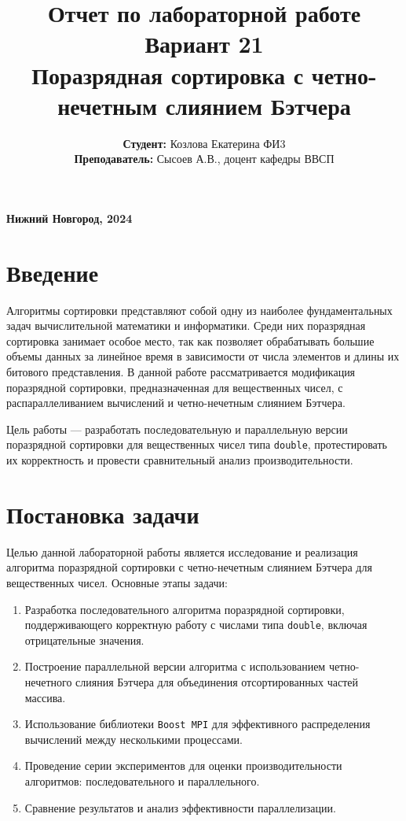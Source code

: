 \documentclass[a4paper,12pt]{article}
\title{
\vspace{6cm}
\textbf{\Large Отчет по лабораторной работе}\\[0.5cm]
\textbf{\Large Вариант 21}\\
\textbf{\Large Поразрядная сортировка с четно-нечетным слиянием Бэтчера} \\[1.0cm]
}
\author{
\textbf{Студент:} Козлова Екатерина ФИ3\\[0.2cm]
\textbf{Преподаватель:} Сысоев А.В., доцент кафедры ВВСП \\[5cm]
}
\date{}
\begin{document}
\maketitle
\vfill
\begin{center}
\textbf{\normalsize Нижний Новгород, 2024}
\end{center}

\newpage

\section*{\centering Введение}

Алгоритмы сортировки представляют собой одну из наиболее фундаментальных задач вычислительной математики и информатики. Среди них поразрядная сортировка занимает особое место, так как позволяет обрабатывать большие объемы данных за линейное время в зависимости от числа элементов и длины их битового представления. В данной работе рассматривается модификация поразрядной сортировки, предназначенная для вещественных чисел, с распараллеливанием вычислений и четно-нечетным слиянием Бэтчера. 

Цель работы — разработать последовательную и параллельную версии поразрядной сортировки для вещественных чисел типа \texttt{double}, протестировать их корректность и провести сравнительный анализ производительности.

\newpage

\section*{\centering Постановка задачи}

Целью данной лабораторной работы является исследование и реализация алгоритма поразрядной сортировки с четно-нечетным слиянием Бэтчера для вещественных чисел. Основные этапы задачи:
\begin{enumerate}
    \item Разработка последовательного алгоритма поразрядной сортировки, поддерживающего корректную работу с числами типа \texttt{double}, включая отрицательные значения.
    \item Построение параллельной версии алгоритма с использованием четно-нечетного слияния Бэтчера для объединения отсортированных частей массива.
    \item Использование библиотеки \texttt{Boost MPI} для эффективного распределения вычислений между несколькими процессами.
    \item Проведение серии экспериментов для оценки производительности алгоритмов: последовательного и параллельного.
    \item Сравнение результатов и анализ эффективности параллелизации.
\end{enumerate}
\end{document}
